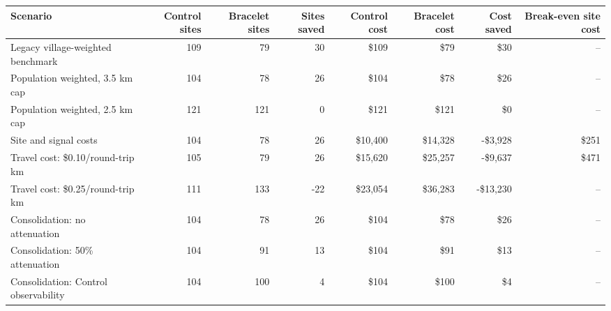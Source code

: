 \begin{tabular}{lrrrrrrr}
\toprule
Scenario & Control sites & Bracelet sites & Sites saved & Control cost & Bracelet cost & Cost saved & Break-even site cost \\
\midrule
Legacy village-weighted benchmark & 109 & 79 & 30 & \$109 & \$79 & \$30 & -- \\
Population weighted, 3.5 km cap & 104 & 78 & 26 & \$104 & \$78 & \$26 & -- \\
Population weighted, 2.5 km cap & 121 & 121 & 0 & \$121 & \$121 & \$0 & -- \\
Site and signal costs & 104 & 78 & 26 & \$10,400 & \$14,328 & -\$3,928 & \$251 \\
Travel cost: \$0.10/round-trip km & 105 & 79 & 26 & \$15,620 & \$25,257 & -\$9,637 & \$471 \\
Travel cost: \$0.25/round-trip km & 111 & 133 & -22 & \$23,054 & \$36,283 & -\$13,230 & -- \\
Consolidation: no attenuation & 104 & 78 & 26 & \$104 & \$78 & \$26 & -- \\
Consolidation: 50\% attenuation & 104 & 91 & 13 & \$104 & \$91 & \$13 & -- \\
Consolidation: Control observability & 104 & 100 & 4 & \$104 & \$100 & \$4 & -- \\
\bottomrule
\end{tabular}
